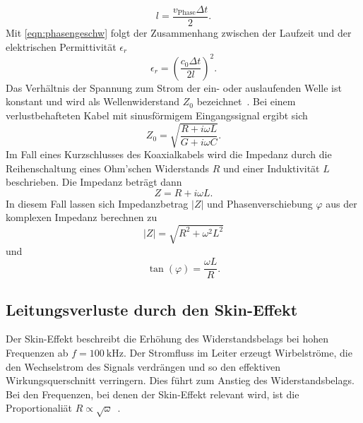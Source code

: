 \begin{equation}
    l = \frac{v_{\mathrm{Phase}} \Delta t}{2}.
    \label{eqn:laenge}
\end{equation}
Mit \autoref{eqn:phasengeschw} folgt der Zusammenhang zwischen der Laufzeit und der elektrischen Permittivität $\epsilon_r$
\begin{equation}
    \epsilon_r = \left(\frac{c_0 \Delta t}{2 l}\right)^2.
    \label{eqn:diel}
\end{equation}
Das Verhältnis der Spannung zum Strom der ein- oder auslaufenden Welle ist konstant und wird als Wellenwiderstand $Z_0$ bezeichnet~\cite[2]{V52}.
Bei einem verlustbehafteten Kabel mit sinusförmigem Eingangssignal ergibt sich
\begin{equation*}
    Z_0 = \sqrt{\frac{R+i\omega L}{G+i\omega C}}.
\end{equation*}
Im Fall eines Kurzschlusses des Koaxialkabels wird die Impedanz durch die Reihenschaltung eines Ohm'schen Widerstands $R$ und einer Induktivität $L$ beschrieben.
Die Impedanz beträgt dann
\begin{equation*}
    Z = R + i\omega L.
\end{equation*}
In diesem Fall lassen sich Impedanzbetrag $\left|Z\right|$ und Phasenverschiebung $\varphi$ aus der komplexen Impedanz berechnen zu
\begin{equation}
    \left|Z\right| = \sqrt{R^2+\omega^2 L^2}
    \label{eqn:impedanz}
\end{equation}
und
\begin{equation}
    \mathrm{\tan}\left(\varphi\right) = \frac{\omega L}{R}.
    \label{eqn:phase}
\end{equation}
%
%
%
\subsection{Leitungsverluste durch den Skin-Effekt}
Der Skin-Effekt beschreibt die Erhöhung des Widerstandsbelags bei hohen Frequenzen ab $f=\qty{100}{\kilo\hertz}$.
Der Stromfluss im Leiter erzeugt Wirbelströme, die den Wechselstrom des Signals verdrängen und so den effektiven Wirkungsquerschnitt verringern.
Dies führt zum Anstieg des Widerstandsbelags.
Bei den Frequenzen, bei denen der Skin-Effekt relevant wird, ist die Proportionaliät $R\propto \sqrt{\omega}$~\cite[128]{beuth_2022}.
%
%
%

